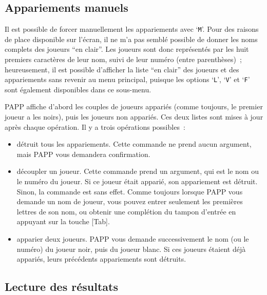 \documentclass[10pt]{article}
\begin{document}
\subsection{Appariements manuels}

Il est possible de forcer manuellement les appariements avec 
`\verb|M|'.  Pour des raisons de place disponible sur l'\'ecran, il ne 
m'a pas sembl\'e possible de donner les noms complets des joueurs ``en 
clair''.  Les joueurs sont donc repr\'esent\'es par les huit premiers 
caract\`eres de leur nom, suivi de leur num\'ero (entre 
parenth\`eses)~; heureusement, il est possible d'afficher la liste ``en 
clair'' des joueurs et des appariements sans revenir au menu 
principal, puisque les options `\verb|L|', `\verb|V|' et `\verb|F|' 
sont \'egalement disponibles dans ce sous-menu.

	PAPP affiche d'abord les couples de joueurs appari\'es (comme
toujours, le premier joueur a les noirs), puis les joueurs non
appari\'es.  Ces deux listes sont mises \`a jour apr\`es chaque
op\'eration.  Il y a trois op\'erations possibles~:

\begin{itemize}

	\item[`{\tt Z}' :] d\'etruit tous les appariements. Cette commande ne
prend aucun argument, mais PAPP vous demandera confirmation.

\item[`{\tt D}' :] d\'ecoupler un joueur. Cette commande prend un 
argument, qui est le nom ou le num\'ero du joueur.  Si ce joueur 
\'etait appari\'e, son appariement est d\'etruit.  Sinon, la commande 
est sans effet.  Comme toujours lorsque PAPP vous demande un nom de 
joueur, vous pouvez entrer seulement les premi\`eres lettres de son 
nom, ou obtenir une compl\'etion du tampon d'entr\'ee en appuyant sur 
la touche [Tab].

\item[`{\tt A}' :] apparier deux joueurs.  PAPP vous demande 
successivement le nom (ou le num\'ero) du joueur noir, puis du joueur 
blanc.  Si ces joueurs \'etaient d\'ej\`a appari\'es, leurs 
pr\'ec\'edents appariements sont d\'etruits.

\end{itemize}

\subsection{Lecture des r\'esultats}
\end{document}
